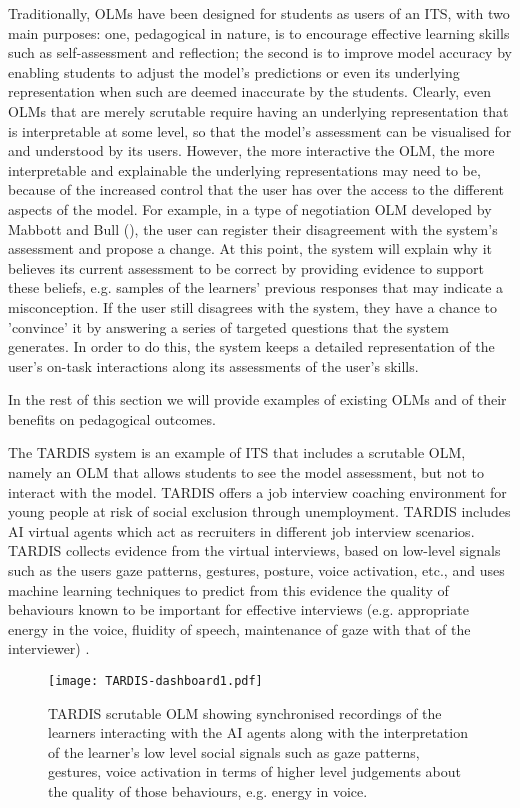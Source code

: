 \documentclass{article}
\begin{document}
Traditionally, OLMs have been designed for students as users of an ITS, with two main purposes: one, pedagogical in nature, is to encourage effective learning skills such as self-assessment and reflection; the second is to improve model accuracy by enabling students to adjust the model's predictions or even its underlying representation when such are deemed inaccurate by the students. Clearly, even OLMs that are merely scrutable require having an underlying representation that is interpretable at some level, so that the model's assessment can be visualised for and understood by its users. However, the more interactive the OLM, the more interpretable and explainable the underlying representations may need to be, because of the increased control that the user has over the access to the different aspects of the model. For example, in a type of negotiation OLM developed by Mabbott and Bull (\citeyear{Mabbott}), the user can register their disagreement with the system's assessment and propose a change. At this point, the system will explain why it believes its current assessment to be correct by providing evidence to support these beliefs, e.g. samples of the learners' previous responses that may indicate a misconception. If the user still disagrees with the system, they have a chance to 'convince' it by answering a series of targeted questions that the system generates. In order to do this, the system keeps a detailed representation of the user's on-task interactions along its assessments of the user's skills.

In the rest of this section we will provide examples of existing OLMs and of their benefits on pedagogical outcomes.

The TARDIS system is an example of ITS that includes a scrutable OLM, namely an OLM that allows students to see the model assessment, but not to interact with the model. TARDIS offers a job interview coaching environment for young people at risk of social exclusion through unemployment. TARDIS includes AI virtual agents which act as recruiters in different job interview scenarios. TARDIS collects evidence from the virtual interviews, based on low-level signals such as the users gaze patterns, gestures, posture, voice activation, etc., and uses machine learning techniques to predict from this evidence the quality of behaviours known to be important for effective interviews (e.g.  appropriate energy in the voice, fluidity of speech, maintenance of gaze with that of the interviewer) \cite{TARDIS2014}.

\begin{figure*}[ht]
\centering
\texttt{[image: TARDIS-dashboard1.pdf]}
\caption{TARDIS scrutable OLM showing synchronised recordings of the learners interacting with the AI agents along with the interpretation of the learner's low level social signals such as gaze patterns, gestures, voice activation in terms of higher level judgements about the quality of those behaviours, e.g. energy in voice.}
\label{fig:TARDIS-dashboard}
\end{figure*}  
\end{document}
